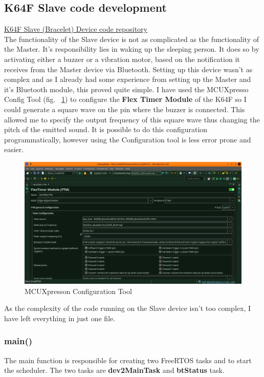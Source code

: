 \documentclass[12pt,a4paper]{article}
\begin{document}
   \subsection{K64F Slave code development}
   \href{https://github.com/zedd-1983/project_dev2/tree/Bluetooth}{K64F Slave (Bracelet) Device code repository}\\
   
   The functionality of the Slave device is not as complicated as the functionality of the Master. It's responsibility lies in waking up the sleeping person. It does so by activating either a buzzer or a vibration motor, based on the notification it receives from the Master device via Bluetooth. 
   Setting up this device wasn't as complex and as I already had some experience from setting up the Master and it's Bluetooth module, this proved quite simple. I have used the MCUXpresso Config Tool (fig. ~\ref{fig:flexTimerConfig}) to configure the {\bfseries Flex Timer Module} of the K64F so I could generate a square wave on the pin where the buzzer is connected. This allowed me to specify the output frequency of this square wave thus changing the pitch of the emitted sound. It is possible to do this configuration programmatically, however using the Configuration tool is less error prone and easier.
   
    \begin{figure}[h]
        \centering
        \includegraphics[width=\textwidth]{FlexTimer_config.jpeg}
        \caption{MCUXpresson Configuration Tool}
        \label{fig:flexTimerConfig}
    \end{figure}
    
    As the complexity of the code running on the Slave device isn't too complex, I have left everything in just one file. 
    
    \subsubsection*{main()}
    The main function is responsible for creating two FreeRTOS tasks and to start the scheduler. The two tasks are {\bfseries dev2MainTask} and {\bfseries btStatus} task.
    
\end{document}
